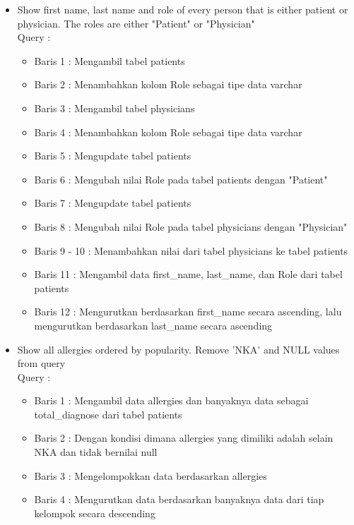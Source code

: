 \documentclass[]{article}
\begin{document}
\begin{itemize}
        \item Show first name, last name and role of every person that is either patient or physician. The roles are either "Patient" or "Physician"
        \\Query :
        
        \begin{itemize}
            \item Baris 1 : Mengambil tabel patients
            \item Baris 2 : Menambahkan kolom Role sebagai tipe data varchar
            \item Baris 3 : Mengambil tabel physicians
            \item Baris 4 : Menambahkan kolom Role sebagai tipe data varchar
            \item Baris 5 : Mengupdate tabel patients
            \item Baris 6 : Mengubah nilai Role pada tabel patients dengan "Patient"
            \item Baris 7 : Mengupdate tabel patients
            \item Baris 8 : Mengubah nilai Role pada tabel physicians dengan "Physician"
            \item Baris 9 - 10 : Menambahkan nilai dari tabel physicians ke tabel patients
            \item Baris 11 : Mengambil data first\_name, last\_name, dan Role dari tabel patients
            \item Baris 12 : Mengurutkan berdasarkan first\_name secara ascending, lalu mengurutkan berdasarkan last\_name secara ascending
        \end{itemize}

        \item Show all allergies ordered by popularity. Remove 'NKA' and NULL values from query
        \\Query :
        
        \begin{itemize}
            \item Baris 1 : Mengambil data allergies dan banyaknya data sebagai total\_diagnose dari tabel patients
            \item Baris 2 : Dengan kondisi dimana allergies yang dimiliki adalah selain NKA dan tidak bernilai null
            \item Baris 3 : Mengelompokkan data berdasarkan allergies
            \item Baris 4 : Mengurutkan data berdasarkan banyaknya data dari tiap kelompok secara descending
        \end{itemize}


\end{itemize}
\end{document}
